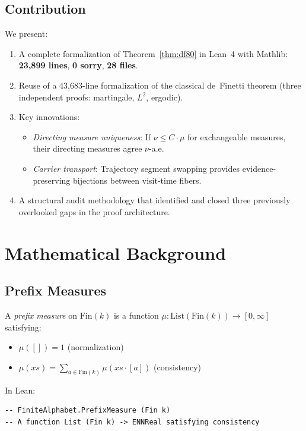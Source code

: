 \documentclass[11pt,a4paper]{article}
\theoremstyle{definition}
\begin{document}
\subsection{Contribution}

We present:
\begin{enumerate}
\item A complete formalization of Theorem~\ref{thm:df80} in Lean~4 with Mathlib:
  \textbf{23,899 lines}, \textbf{0 sorry}, \textbf{28 files}.
\item Reuse of a 43,683-line formalization of the classical de~Finetti theorem
  (three independent proofs: martingale, $L^2$, ergodic).
\item Key innovations:
  \begin{itemize}
  \item \emph{Directing measure uniqueness}: If $\nu \leq C \cdot \mu$ for
    exchangeable measures, their directing measures agree $\nu$-a.e.
  \item \emph{Carrier transport}: Trajectory segment swapping provides
    evidence-preserving bijections between visit-time fibers.
  \end{itemize}
\item A structural audit methodology that identified and closed three
  previously overlooked gaps in the proof architecture.
\end{enumerate}

\section{Mathematical Background}

\subsection{Prefix Measures}

A \emph{prefix measure} on $\mathrm{Fin}(k)$ is a function
$\mu : \mathrm{List}(\mathrm{Fin}(k)) \to [0, \infty]$ satisfying:
\begin{itemize}
\item $\mu([]) = 1$ (normalization)
\item $\mu(xs) = \sum_{a \in \mathrm{Fin}(k)} \mu(xs \cdot [a])$ (consistency)
\end{itemize}

In Lean:
\begin{lstlisting}
-- FiniteAlphabet.PrefixMeasure (Fin k)
-- A function List (Fin k) -> ENNReal satisfying consistency
\end{lstlisting}
\end{document}
